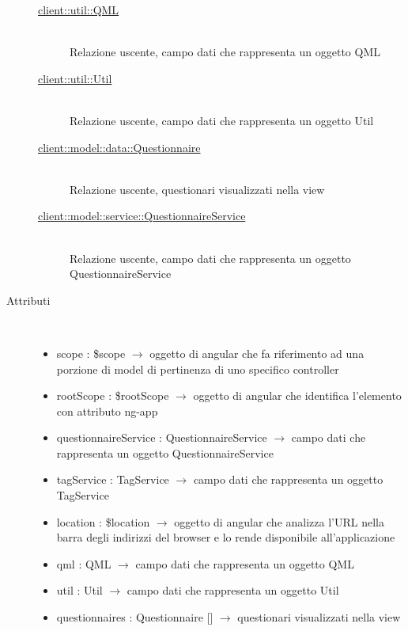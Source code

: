 \begin{description}
\begin{description}
	\item[\hyperlink{client::util::QML}{client::util::QML}] \hfill \\
	Relazione uscente, campo dati che rappresenta un oggetto QML
	\item[\hyperlink{client::util::Util}{client::util::Util}] \hfill \\
	Relazione uscente, campo dati che rappresenta un oggetto Util
	\item[\hyperlink{client::model::data::Questionnaire}{client::model::data::Questionnaire}] \hfill \\
	Relazione uscente, questionari visualizzati nella view
	\item[\hyperlink{client::model::service::QuestionnaireService}{client::model::service::QuestionnaireService}] \hfill \\
	Relazione uscente, campo dati che rappresenta un oggetto QuestionnaireService
\end{description}

\item[Attributi] \hfill \\
\vspace{-7mm}
\begin{itemize}
	\item scope : \$scope $\rightarrow$ oggetto di angular che fa riferimento ad una porzione di model di pertinenza di uno specifico controller
	\item rootScope : \$rootScope $\rightarrow$ oggetto di angular che identifica l’elemento con attributo ng-app
	\item questionnaireService : QuestionnaireService $\rightarrow$ campo dati che rappresenta un oggetto QuestionnaireService
	\item tagService : TagService $\rightarrow$ campo dati che rappresenta un oggetto TagService
	\item location : \$location $\rightarrow$ oggetto di angular che analizza l'URL nella barra degli indirizzi del browser e lo rende disponibile all'applicazione
	\item qml : QML $\rightarrow$ campo dati che rappresenta un oggetto QML
	\item util : Util $\rightarrow$ campo dati che rappresenta un oggetto Util
	\item questionnaires : Questionnaire [] $\rightarrow$ questionari visualizzati nella view
\end{itemize}


\end{description}
